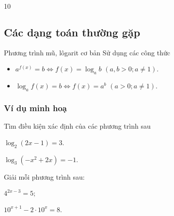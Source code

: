 \begin{indapan}{10}
\subsection{Các dạng toán thường gặp}
\begin{dang}{Phương trình mũ, lôgarit cơ bản}
	Sử dụng các công thức
	\begin{itemize}
		\item $a^{f(x)}=b \Leftrightarrow f(x)=\log_a b$ $(a,b>0; a\neq 1)$.
		\item $\log_a f(x)=b\Leftrightarrow f(x)=a^b$ $(a>0;a\neq 1)$.
	\end{itemize}
\end{dang}
\subsubsection{Ví dụ minh hoạ}

\begin{vd}%
	Tìm điều kiện xác định của các phương trình sau
	\begin{listEX}[2]
		\item $\log_2(2x-1)=3$.
		\item $\log_3\left(-x^2+2x\right)=-1$.
	\end{listEX}
\end{vd}

\begin{vd} %
	Giải mỗi phương trình sau:
	\begin{listEX}[2]
		\item $4^{2x-3}=5$;
		\item $10^{x+1}-2\cdot 10^x=8$.
	\end{listEX}
\end{vd}


\end{indapan}
